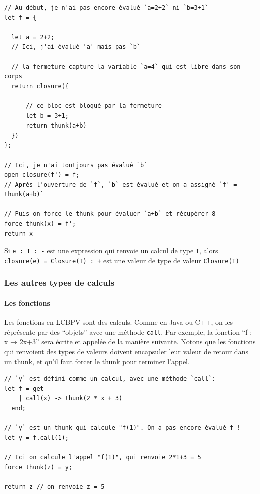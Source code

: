 \documentclass[12pt]{article}
\begin{document}
\begin{verbatim}
// Au début, je n'ai pas encore évalué `a=2+2` ni `b=3+1`
let f = {

  let a = 2+2;
  // Ici, j'ai évalué 'a' mais pas `b`
    
  // la fermeture capture la variable `a=4` qui est libre dans son corps 
  return closure({
  
      // ce bloc est bloqué par la fermeture
      let b = 3+1;
      return thunk(a+b)
  })
};
  
// Ici, je n'ai toutjours pas évalué `b`
open closure(f') = f;
// Après l'ouverture de `f`, `b` est évalué et on a assigné `f' = thunk(a+b)` 
  
// Puis on force le thunk pour évaluer `a+b` et récupérer 8
force thunk(x) = f';
return x
\end{verbatim}

Si \texttt{e\ :\ T\ :\ -} est une expression qui renvoie un calcul de
type \texttt{T}, alors \texttt{closure(e)\ =\ Closure(T)\ :\ +} est une
valeur de type de valeur \texttt{Closure(T)}

\hypertarget{les-autres-types-de-calculs}{%
      \subsubsection*{Les autres types de
            calculs}\label{les-autres-types-de-calculs}}

\hypertarget{les-fonctions}{%
      \paragraph*{Les fonctions}\label{les-fonctions}}

Les fonctions en LCBPV sont des calculs. Comme en Java ou C++, on les
réprésente par des ``objets'' avec une méthode \texttt{call}. Par
exemple, la fonction ``f : x → 2x+3'' sera écrite et appelée de la
manière suivante. Notons que les fonctions qui renvoient des types de
valeurs doivent encapsuler leur valeur de retour dans un thunk, et qu'il
faut forcer le thunk pour terminer l'appel.

\begin{verbatim}
// `y` est défini comme un calcul, avec une méthode `call`:
let f = get 
    | call(x) -> thunk(2 * x + 3)
  end;
  
// `y` est un thunk qui calcule "f(1)". On a pas encore évalué f !
let y = f.call(1);

// Ici on calcule l'appel "f(1)", qui renvoie 2*1+3 = 5
force thunk(z) = y;

return z // on renvoie z = 5
\end{verbatim}
\end{document}
